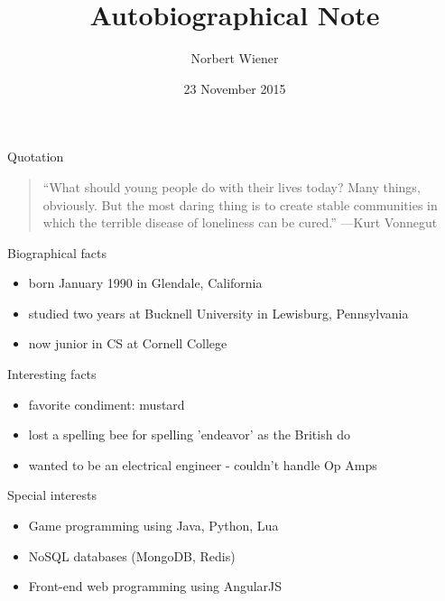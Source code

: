 \documentclass{beamer}
\title{Autobiographical Note}
\author{Norbert Wiener}
\institute{Cornell College}
\date{23 November 2015}
\begin{document}
 
\begin{frame}
  \titlepage
\end{frame}

\begin{frame}{Quotation}
\begin{quotation}
\noindent
``What should young people do with their lives today? Many things,
obviously. But the most daring thing is to create stable communities
in which the terrible disease of loneliness can be cured.''
  \flushright 
  ---Kurt Vonnegut
  \end{quotation}
\end{frame}

\begin{frame}{Biographical facts}
\begin{itemize}
  \item born January 1990 in Glendale, California
  \item studied two years at Bucknell University in Lewisburg, Pennsylvania
  \item now junior in CS at Cornell College
  \end{itemize}
\end{frame}

\begin{frame}{Interesting facts}
\begin{itemize}
  \item favorite condiment: mustard
  \item lost a spelling bee for spelling 'endeavor' as the British do
  \item wanted to be an electrical engineer - couldn't handle Op Amps
  \end{itemize}
\end{frame}

\begin{frame}{Special interests}
\begin{itemize}
  \item Game programming using Java, Python, Lua
  \item NoSQL databases (MongoDB, Redis)
  \item Front-end web programming using AngularJS
  \end{itemize}
\end{frame}
\end{document}
